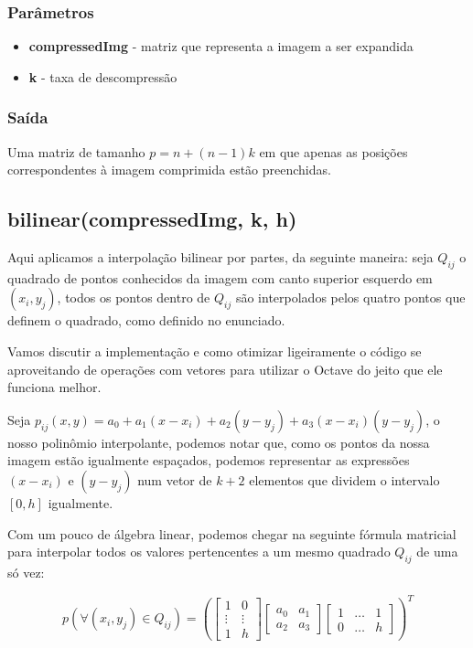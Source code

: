 \documentclass[leqno]{article}
\begin{document}
\subsubsection{Parâmetros}
\begin{itemize}
    \item \textbf{compressedImg} - matriz que representa a imagem a ser expandida
    \item \textbf{k} - taxa de descompressão
\end{itemize}

\subsubsection{Saída}
Uma matriz de tamanho $p = n + (n-1)k$ em que apenas as posições correspondentes
à imagem comprimida estão preenchidas.

\subsection{bilinear(compressedImg, k, h)}
Aqui aplicamos a interpolação bilinear por partes, da seguinte maneira: seja
$Q_{ij}$ o quadrado de pontos conhecidos da imagem com canto superior esquerdo
em $(x_i, y_j)$, todos os pontos dentro de $Q_{ij}$ são interpolados pelos
quatro pontos que definem o quadrado, como definido no enunciado.


Vamos discutir a implementação e como otimizar ligeiramente o código se aproveitando
de operações com vetores para utilizar o Octave do jeito que ele funciona melhor.

Seja $p_{ij}(x,y) = a_0 + a_1(x - x_i) + a_2(y - y_j) + a_3(x - x_i)(y - y_j)$,
o nosso polinômio interpolante, podemos notar que, como os pontos da nossa imagem
estão igualmente espaçados, podemos representar as expressões $(x - x_i)$ e
$(y - y_j)$ num vetor de $k+2$ elementos que dividem o intervalo $[0, h]$ igualmente. 

Com um pouco de álgebra linear, podemos chegar na seguinte fórmula matricial para
interpolar todos os valores pertencentes a um mesmo quadrado $Q_{ij}$ de uma só
vez:

$$ p(\forall(x_i, y_j) \in Q_{ij}) = \left( \begin{bmatrix}
       1   & 0      \\
    \vdots & \vdots \\
       1   & h
    \end{bmatrix}
    \begin{bmatrix}
        a_0   & a_1      \\
        a_2   & a_3
     \end{bmatrix} 
     \begin{bmatrix}
        1  & \ldots   & 1    \\
        0  & \ldots   & h
     \end{bmatrix}\right)^T
    $$
\end{document}
